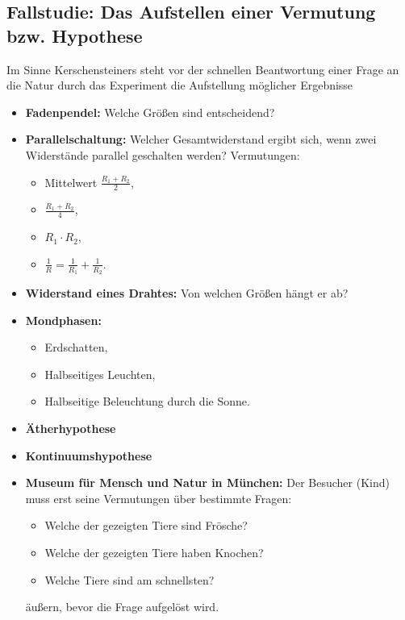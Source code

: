 \subsection{Fallstudie: Das Aufstellen einer Vermutung bzw. Hypothese}
Im Sinne Kerschensteiners  steht vor der schnellen Beantwortung einer
Frage an die Natur durch das Experiment die Aufstellung m\"{o}glicher Ergebnisse
\bip
\begin{beisp2}
	\begin{itemize}
\item \textbf{Fadenpendel:}
Welche Gr\"{o}{\ss}en sind entscheidend?
\item \textbf{Parallelschaltung:} Welcher Gesamtwiderstand ergibt sich,
wenn zwei Widerst\"{a}nde parallel geschalten werden? Vermutungen:
    \begin{itemize}
      \item Mittelwert $\frac{R_1 + R_2}2$,
      \item $\frac{R_1+R_2}4$,
      \item $R_1 \cdot R_2$,
      \item $\frac{1}{R} = \frac{1}{R_1} + \frac{1}{R_2}$.
    \end{itemize}
\item \textbf{Widerstand eines Drahtes:} Von welchen Gr\"{o}{\ss}en h\"{a}ngt er ab?
\item \textbf{Mondphasen:}
\begin{itemize}
  \item Erdschatten,
  \item Halbseitiges Leuchten,
  \item Halbseitige Beleuchtung durch die Sonne.
\end{itemize}
\item \textbf{\"{A}therhypothese}
\item \textbf{Kontinuumshypothese}
\item \textbf{Museum f\"{u}r Mensch und Natur in M\"{u}nchen:} Der Besucher (Kind) muss erst
seine Vermutungen \"{u}ber bestimmte Fragen:
\begin{itemize}
\item Welche der gezeigten Tiere sind Fr\"{o}sche?
\item Welche der gezeigten Tiere haben Knochen?
\item Welche Tiere sind am schnellsten?
\end{itemize}
\"{a}u{\ss}ern, bevor die Frage aufgel\"{o}st wird.
\end{itemize}
\end{beisp2}



